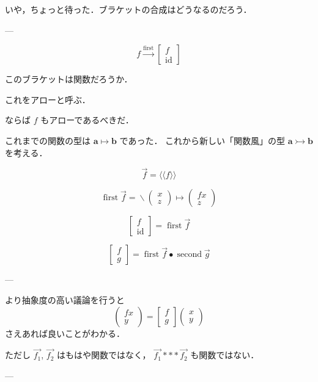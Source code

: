 \documentclass[a5paper,twoside,fleqn,draft]{jsbook}
\newcommand{\Langle}{\langle\!\langle}
\newcommand{\Rangle}{\rangle\!\rangle}
\newcommand{\mSpecialFunc}[1]{#1}
\DeclareMathOperator{\mFirst}{\mSpecialFunc{first}}
\DeclareMathOperator{\mId}{\mSpecialFunc{id}}
\DeclareMathOperator{\mSecond}{\mSpecialFunc{second}}
\DeclareMathOperator{\mCatMapsTo}{\rightarrowtail}
\DeclareMathOperator{\mCompCat}{\bullet}
\DeclareMathOperator{\mFuncArrow}{\mapsto}
\DeclareMathOperator{\mLambda}{\backslash}
\DeclareMathOperator{\mLambdaArrow}{\mapsto}
\newcommand{\mType}[1]{\mathbf{#1}} %
\newcommand{\mA}{\mType{a}}
\newcommand{\mB}{\mType{b}}
\newcommand{\mArrowWith}[1]{\Langle#1\Rangle}
\newcommand{\mPairWith}[2]{\begin{pmatrix}#1\\#2\end{pmatrix}}
\begin{document}
いや，ちょっと待った．ブラケットの合成はどうなるのだろう．

---

\begin{equation}
  f
  \xrightarrow{\mFirst}
  \begin{bmatrix}
    f\\
    \mId
  \end{bmatrix}
\end{equation}

このブラケットは関数だろうか．

これをアローと呼ぶ．

ならば $f$ もアローであるべきだ．

これまでの関数の型は $\mA\mFuncArrow\mB$ であった．
これから新しい「関数風」の型 $\mA\mCatMapsTo\mB$ を考える．

\begin{equation}
  \Vec{f}
  =\mArrowWith{f}
\end{equation}

\begin{equation}
  \mFirst\Vec{f}
  =\mLambda{\mPairWith{x}{z}}\mLambdaArrow\mPairWith{fx}{z}
\end{equation}

\begin{equation}
  \begin{bmatrix}
    f\\
    \mId
  \end{bmatrix}
  =\mFirst\Vec{f}
\end{equation}

\begin{equation}
  \begin{bmatrix}
    f\\g
  \end{bmatrix}
  =\mFirst\Vec{f}\mCompCat\mSecond\Vec{g}
\end{equation}

---

より抽象度の高い議論を行うと
\begin{equation}
  \mPairWith{fx}{y}
  =\begin{bmatrix}f\\g\end{bmatrix}
  \mPairWith{x}{y}
\end{equation}
さえあれば良いことがわかる．


ただし $\Vec{f_1}$, $\Vec{f_2}$ はもはや関数ではなく，
$\Vec{f_1}***\Vec{f_2}$ も関数ではない．

---
\end{document}

